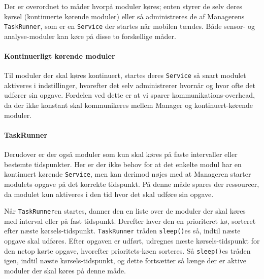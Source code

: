 Der er overordnet to måder hvorpå moduler køres; enten styrer de selv deres kørsel (kontinuerte kørende moduler) eller så administreres de af Managerens \texttt{TaskRunner}, som er en \texttt{Service} der startes når mobilen tændes.
Både sensor- og analyse-moduler kan køre på disse to forskellige måder.

\paragraph{Kontinuerligt kørende moduler}
Til moduler der skal køres kontinuert, startes deres \texttt{Service} så snart modulet aktiveres i indstillinger, hvorefter det selv administrerer hvornår og hvor ofte det udfører sin opgave.
Fordelen ved dette er at vi sparer kommunikations-overhead, da der ikke konstant skal kommunikeres mellem Manager og kontinuert-kørende moduler.

\paragraph{TaskRunner}
Derudover er der også moduler som kun skal køres på faste intervaller eller bestemte tidspunkter.
Her er der ikke behov for at det enkelte modul har en kontinuert kørende \texttt{Service}, men kan derimod nøjes med at Manageren starter modulets opgave på det korrekte tidspunkt.
På denne måde spares der ressourcer, da modulet kun aktiveres i den tid hvor det skal udføre sin opgave. 

Når \texttt{TaskRunner}en startes, danner den en liste over de moduler der skal køres med interval eller på fast tidspunkt.
Derefter laver den en prioriteret kø, sorteret efter næste kørsels-tidspunkt.
\texttt{TaskRunner} tråden \texttt{sleep()}es så, indtil næste opgave skal udføres.
Efter opgaven er udført, udregnes næste kørsels-tidspunkt for den netop kørte opgave, hvorefter prioritets-køen sorteres.
Så \texttt{sleep()}es tråden igen, indtil næste kørsels-tidspunkt, og dette fortsætter så længe der er aktive moduler der skal køres på denne måde.
